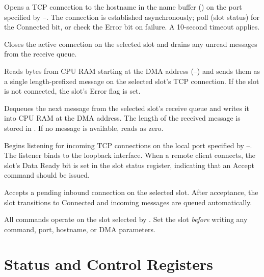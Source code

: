 
Opens a TCP connection to the hostname in the name buffer () on the
port specified by --.  The connection is established
asynchronously; poll  (slot status) for the Connected bit, or check
the Error bit on failure.  A 10-second timeout applies.


Closes the active connection on the selected slot and drains any unread
messages from the receive queue.


Reads  bytes from CPU RAM starting at the DMA address
(--) and sends them as a single length-prefixed message
on the selected slot's TCP connection.  If the slot is not connected, the
slot's Error flag is set.


Dequeues the next message from the selected slot's receive queue and writes it
into CPU RAM at the DMA address.  The length of the received message is stored
in .  If no message is available,  reads as zero.


Begins listening for incoming TCP connections on the local port specified by
--.  The listener binds to the loopback interface.  When
a remote client connects, the slot's Data Ready bit is set in the slot status
register, indicating that an Accept command should be issued.


Accepts a pending inbound connection on the selected slot.  After acceptance,
the slot transitions to Connected and incoming messages are queued automatically.

\begin{notebox}
All commands operate on the slot selected by .  Set the slot
\emph{before} writing any command, port, hostname, or DMA parameters.
\end{notebox}


\section{Status and Control Registers}
\label{sec:nic-status}

